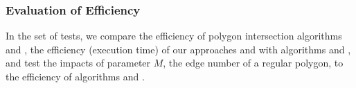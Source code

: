 \subsubsection{Evaluation of Efficiency}


In the set of tests, we compare the efficiency of polygon intersection algorithms \rpia and \cpia, the efficiency (execution time) of our approaches \cist and \cista with algorithms \dpa and \squishe, and test the impacts of parameter $M$, \ie the edge number of a regular polygon, to the efficiency of algorithms \cist and \cista.
%





